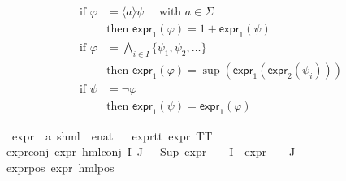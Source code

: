 \begin{isabellebody}
\begin{isamarkuptext}
\begin{align*}
    \text{if } \varphi &= \langle a \rangle \psi \quad \text{ with } a \in \Sigma \\
    &\text{then } \textsf{expr}_1(\varphi) = 1 + \textsf{expr}_1(\psi) \\
    \text{if } \varphi &= \bigwedge_{i \in I} \{ \psi_1, \psi_2, \ldots \} \\
    &\text{then } \textsf{expr}_1(\varphi) = \sup(\textsf{expr}_1(\textsf{expr}_2(\psi_i))) \\
    \text{if } \psi &= \neg \varphi \\
    &\text{then } \textsf{expr}_1(\psi) = \textsf{expr}_1(\varphi)
\end{align*}%
\end{isamarkuptext}\isamarkuptrue%
\isamarkupfalse%
\ expr{\isacharunderscore}{\kern0pt}{}\ {\isacharcolon}{\kern0pt}{\isacharcolon}{\kern0pt}\ {\isachardoublequoteopen}{\isacharparenleft}{\kern0pt}{\isacharprime}{\kern0pt}a{\isacharcomma}{\kern0pt}\ {\isacharprime}{\kern0pt}s{\isacharparenright}{\kern0pt}hml\ {\isasymRightarrow}\ enat{\isachardoublequoteclose}\isanewline
\ \ \isanewline
expr{\isacharunderscore}{\kern0pt}{}{\isacharunderscore}{\kern0pt}tt{\isacharcolon}{\kern0pt}\ {\isacartoucheopen}expr{\isacharunderscore}{\kern0pt}{}\ TT\ {\isacharequal}{\kern0pt}\ {}{\isacartoucheclose}\ {\isacharbar}{\kern0pt}\isanewline
expr{\isacharunderscore}{\kern0pt}{}{\isacharunderscore}{\kern0pt}conj{\isacharcolon}{\kern0pt}\ {\isacartoucheopen}expr{\isacharunderscore}{\kern0pt}{}\ {\isacharparenleft}{\kern0pt}hml{\isacharunderscore}{\kern0pt}conj\ I\ J\ {\isasymPhi}{\isacharparenright}{\kern0pt}\ {\isacharequal}{\kern0pt}\ Sup\ {\isacharparenleft}{\kern0pt}{\isacharparenleft}{\kern0pt}expr{\isacharunderscore}{\kern0pt}{}\ {\isasymcirc}\ {\isasymPhi}{\isacharparenright}{\kern0pt}\ {\isacharbackquote}{\kern0pt}\ I\ {\isasymunion}\ {\isacharparenleft}{\kern0pt}expr{\isacharunderscore}{\kern0pt}{}\ {\isasymcirc}\ {\isasymPhi}{\isacharparenright}{\kern0pt}\ {\isacharbackquote}{\kern0pt}\ J{\isacharparenright}{\kern0pt}{\isacartoucheclose}\ {\isacharbar}{\kern0pt}\isanewline
expr{\isacharunderscore}{\kern0pt}{}{\isacharunderscore}{\kern0pt}pos{\isacharcolon}{\kern0pt}\ {\isacartoucheopen}expr{\isacharunderscore}{\kern0pt}{}\ {\isacharparenleft}{\kern0pt}hml{\isacharunderscore}{\kern0pt}pos\ {\isasymalpha}\ {\isasymphi}{\isacharparenright}{\kern0pt}\ {\isacharequal}{\kern0pt}\ \isanewline

\end{isabellebody}
